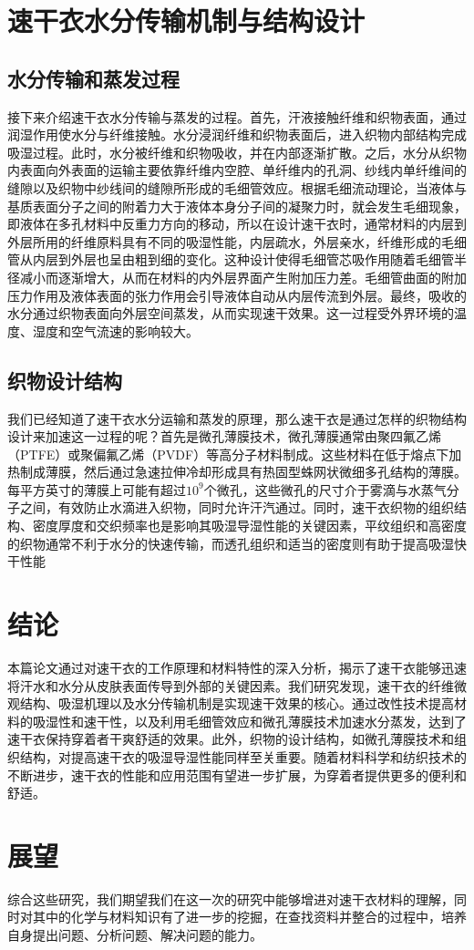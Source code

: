 \documentclass{article}
\begin{document}
\begin{multicols}{2}
\section{速干衣水分传输机制与结构设计}
\subsection{水分传输和蒸发过程\cite{Hu2021}} 
接下来介绍速干衣水分传输与蒸发的过程。首先，汗液接触纤维和织物表面，通过润湿作用使水分与纤维接触。水分浸润纤维和织物表面后，进入织物内部结构完成吸湿过程。此时，水分被纤维和织物吸收，并在内部逐渐扩散。之后，水分从织物内表面向外表面的运输主要依靠纤维内空腔、单纤维内的孔洞、纱线内单纤维间的缝隙以及织物中纱线间的缝隙所形成的毛细管效应。根据毛细流动理论，当液体与基质表面分子之间的附着力大于液体本身分子间的凝聚力时，就会发生毛细现象，即液体在多孔材料中反重力方向的移动，所以在设计速干衣时，通常材料的内层到外层所用的纤维原料具有不同的吸湿性能，内层疏水，外层亲水，纤维形成的毛细管从内层到外层也呈由粗到细的变化。这种设计使得毛细管芯吸作用随着毛细管半径减小而逐渐增大，从而在材料的内外层界面产生附加压力差。毛细管曲面的附加压力作用及液体表面的张力作用会引导液体自动从内层传流到外层。最终，吸收的水分通过织物表面向外层空间蒸发，从而实现速干效果。这一过程受外界环境的温度、湿度和空气流速的影响较大。
\subsection{织物设计结构\cite{Chen2005}}

我们已经知道了速干衣水分运输和蒸发的原理，那么速干衣是通过怎样的织物结构设计来加速这一过程的呢？首先是微孔薄膜技术，微孔薄膜通常由聚四氟乙烯（PTFE）或聚偏氟乙烯（PVDF）等高分子材料制成。这些材料在低于熔点下加热制成薄膜，然后通过急速拉伸冷却形成具有热固型蛛网状微细多孔结构的薄膜。每平方英寸的薄膜上可能有超过$10^9$个微孔，这些微孔的尺寸介于雾滴与水蒸气分子之间，有效防止水滴进入织物，同时允许汗汽通过。同时，速干衣织物的组织结构、密度厚度和交织频率也是影响其吸湿导湿性能的关键因素，平纹组织和高密度的织物通常不利于水分的快速传输，而透孔组织和适当的密度则有助于提高吸湿快干性能

\section{结论}
本篇论文通过对速干衣的工作原理和材料特性的深入分析，揭示了速干衣能够迅速将汗水和水分从皮肤表面传导到外部的关键因素。我们研究发现，速干衣的纤维微观结构、吸湿机理以及水分传输机制是实现速干效果的核心。通过改性技术提高材料的吸湿性和速干性，以及利用毛细管效应和微孔薄膜技术加速水分蒸发，达到了速干衣保持穿着者干爽舒适的效果。此外，织物的设计结构，如微孔薄膜技术和组织结构，对提高速干衣的吸湿导湿性能同样至关重要。随着材料科学和纺织技术的不断进步，速干衣的性能和应用范围有望进一步扩展，为穿着者提供更多的便利和舒适。
\section{展望}
综合这些研究，我们期望我们在这一次的研究中能够增进对速干衣材料的理解，同时对其中的化学与材料知识有了进一步的挖掘，在查找资料并整合的过程中，培养自身提出问题、分析问题、解决问题的能力。

\end{multicols}
\end{document}
